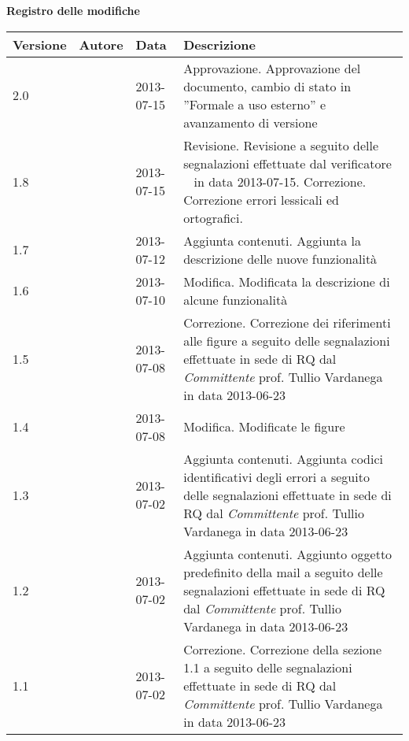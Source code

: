 \Large{\textbf{Registro delle modifiche}}\\
\normalsize

\label{tabVers}
\begin{longtable}{p{} p{} p{} p{}} 

\toprule
\textbf{Versione}	&	\textbf{Autore}	&	\textbf{Data}	&	\textbf{Descrizione}\\
\midrule
2.0	&	\MB &	2013-07-15 	&	Approvazione.\newline
						Approvazione del documento, cambio di stato in ”Formale a uso esterno” e avanzamento di versione\\
\midrule
1.8	&	\SL &	2013-07-15 	&	Revisione.\newline
						Revisione a seguito delle segnalazioni effettuate dal verificatore \DC~ in data 2013-07-15.\newline
						Correzione.\newline
						Correzione errori lessicali ed ortografici.\\
\midrule
1.7	&	\SL &	2013-07-12 	& Aggiunta contenuti. \newline Aggiunta la descrizione delle nuove funzionalità\\
\midrule
1.6	&	\SL &	2013-07-10 	& Modifica. \newline Modificata la descrizione di alcune funzionalità\\
\midrule
1.5	&	\SL &	2013-07-08	& Correzione. \newline Correzione dei riferimenti alle figure a seguito delle segnalazioni effettuate in sede di RQ dal \emph{Committente} prof. Tullio Vardanega in data 2013-06-23\\
\midrule
1.4	&	\SL &	2013-07-08 	& Modifica. \newline Modificate le figure\\
\midrule
1.3	&	\SL &	2013-07-02 	& Aggiunta contenuti. \newline Aggiunta codici identificativi degli errori a seguito delle segnalazioni effettuate in sede di RQ dal \emph{Committente} prof. Tullio Vardanega in data 2013-06-23\\
\midrule
1.2	&	\SL &	2013-07-02 	&	Aggiunta contenuti. \newline Aggiunto oggetto predefinito della mail a seguito delle segnalazioni effettuate in sede di RQ dal \emph{Committente} prof. Tullio Vardanega in data 2013-06-23\\
\midrule
1.1	&	\SL &	2013-07-02 	& Correzione. \newline Correzione della sezione 1.1 a seguito delle segnalazioni effettuate in sede di RQ dal \emph{Committente} prof. Tullio Vardanega in data 2013-06-23\\





\end{longtable}
